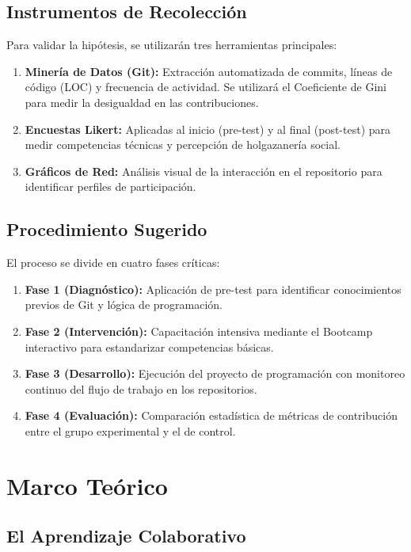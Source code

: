\documentclass[12pt,a4paper]{article}
\begin{document}
\subsection{Instrumentos de Recolección}
Para validar la hipótesis, se utilizarán tres herramientas principales:
\begin{enumerate}
    \item \textbf{Minería de Datos (Git):} Extracción automatizada de commits, líneas de código (LOC) y frecuencia de actividad. Se utilizará el Coeficiente de Gini para medir la desigualdad en las contribuciones.
    \item \textbf{Encuestas Likert:} Aplicadas al inicio (pre-test) y al final (post-test) para medir competencias técnicas y percepción de holgazanería social.
    \item \textbf{Gráficos de Red:} Análisis visual de la interacción en el repositorio para identificar perfiles de participación.
\end{enumerate}

\subsection{Procedimiento Sugerido}
El proceso se divide en cuatro fases críticas:
\begin{enumerate}
    \item \textbf{Fase 1 (Diagnóstico):} Aplicación de pre-test para identificar conocimientos previos de Git y lógica de programación.
    \item \textbf{Fase 2 (Intervención):} Capacitación intensiva mediante el Bootcamp interactivo para estandarizar competencias básicas.
    \item \textbf{Fase 3 (Desarrollo):} Ejecución del proyecto de programación con monitoreo continuo del flujo de trabajo en los repositorios.
    \item \textbf{Fase 4 (Evaluación):} Comparación estadística de métricas de contribución entre el grupo experimental y el de control.
\end{enumerate}

\section{Marco Teórico}

\subsection{El Aprendizaje Colaborativo}
\end{document}

